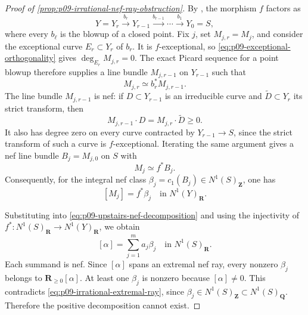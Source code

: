 \begin{proof}[Proof of \cref{prop:p09-irrational-nef-ray-obstruction}]
By \cite[Tag~0C5Q]{stacks-project}, the morphism \(f\) factors as
\[
 Y=Y_r\xrightarrow{b_r}Y_{r-1}\xrightarrow{b_{r-1}}\cdots
   \xrightarrow{b_1}Y_0=S,
\]
where every \(b_\ell\) is the blowup of a closed point.  Fix \(j\), set
\(M_{j,r}=M_j\), and consider the exceptional curve \(E_r\subset Y_r\)
of \(b_r\).  It is \(f\)-exceptional, so
\eqref{eq:p09-exceptional-orthogonality} gives
\(\deg_{E_r}M_{j,r}=0\).  The exact Picard sequence for a point blowup
\cite[Tag~0C5L]{stacks-project} therefore supplies a line bundle
\(M_{j,r-1}\) on \(Y_{r-1}\) such that
\[
                              M_{j,r}\simeq b_r^*M_{j,r-1}.
\]
The line bundle \(M_{j,r-1}\) is nef: if \(D\subset Y_{r-1}\) is an
irreducible curve and \(\widetilde D\subset Y_r\) its strict transform,
then
\[
                     M_{j,r-1}\cdot D
                   = M_{j,r}\cdot\widetilde D\geq0.
\]
It also has degree zero on every curve contracted by
\(Y_{r-1}\to S\), since the strict transform of such a curve is
\(f\)-exceptional.  Iterating the same argument gives a nef line bundle
\(B_j=M_{j,0}\) on \(S\) with
\[
                         M_j\simeq f^*B_j.
\]
Consequently, for the integral nef class
\(\beta_j=c_1(B_j)\in N^1(S)_{\mathbf Z}\), one has
\[
                         [M_j]=f^*\beta_j
                  \quad\text{in }N^1(Y)_{\mathbf R}.
\]

Substituting into \eqref{eq:p09-upstairs-nef-decomposition} and using the
injectivity of \(f^*:N^1(S)_{\mathbf R}\to N^1(Y)_{\mathbf R}\), we obtain
\begin{equation}
\label{eq:p09-downstairs-nef-decomposition}
                              [\alpha]=\sum_{j=1}^{m}a_j\beta_j
                       \quad\text{in }N^1(S)_{\mathbf R}.
\end{equation}
Each summand is nef.  Since \([\alpha]\) spans an extremal nef ray,
every nonzero \(\beta_j\) belongs to \(\mathbf R_{\geq0}[\alpha]\).  At
least one \(\beta_j\) is nonzero because \([\alpha]\ne0\).  This contradicts
\eqref{eq:p09-irrational-extremal-ray}, since
\(\beta_j\in N^1(S)_{\mathbf Z}\subset N^1(S)_{\mathbf Q}\).
Therefore the positive decomposition cannot exist.


\end{proof}
